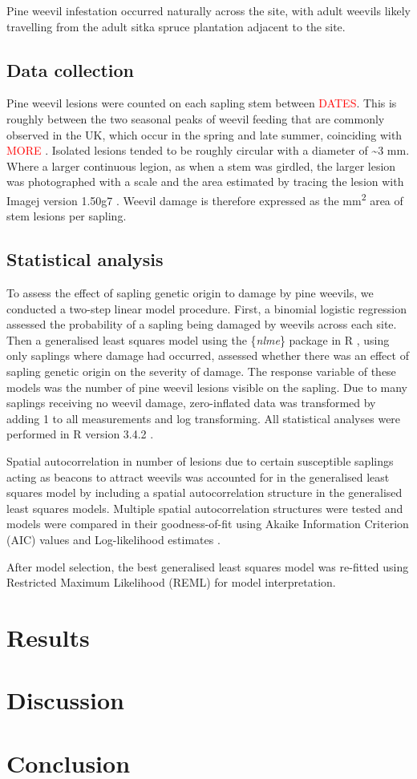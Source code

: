 \documentclass[a4paper, 11pt]{article}
\newcommand{\todo}[1]{\textcolor{red}{#1}}   %
\begin{document}
Pine weevil infestation occurred naturally across the site, with adult weevils likely travelling from the adult sitka spruce plantation adjacent to the site. 


\subsection*{Data collection}

Pine weevil lesions were counted on each sapling stem between \todo{DATES}. This is roughly between the two seasonal peaks of weevil feeding that are commonly observed in the UK, which occur in the spring and late summer, coinciding with \todo{MORE} \citep{}. Isolated lesions tended to be roughly circular with a diameter of \textasciitilde{}3 mm. Where a larger continuous legion, as when a stem was girdled, the larger lesion was photographed with a scale and the area estimated by tracing the lesion with Imagej version 1.50g7 \citep{Schneider2012}. Weevil damage is therefore expressed as the mm\textsuperscript{2} area of stem lesions per sapling. 

\subsection*{Statistical analysis}

To assess the effect of sapling genetic origin to damage by pine weevils, we conducted a two-step linear model procedure. First, a binomial logistic regression assessed the probability of a sapling being damaged by weevils across each site. Then a generalised least squares model using the \{\textit{nlme}\} package in R \citep{Pinheiro2018}, using only saplings where damage had occurred, assessed whether there was an effect of sapling genetic origin on the severity of damage. The response variable of these models was the number of pine weevil lesions visible on the sapling. Due to many saplings receiving no weevil damage, zero-inflated data was transformed by adding 1 to all measurements and log transforming. All statistical analyses were performed in R version 3.4.2 \citep{RCoreTeam2017}.

Spatial autocorrelation in number of lesions due to certain susceptible saplings acting as beacons to attract weevils was accounted for in the generalised least squares model by including a spatial autocorrelation structure in the generalised least squares models. Multiple spatial autocorrelation structures were tested and models were compared in their goodness-of-fit using Akaike Information Criterion (AIC) values and Log-likelihood estimates \citep{}. 

After model selection, the best generalised least squares model was re-fitted using Restricted Maximum Likelihood (REML) for model interpretation.

\section*{Results}

\section*{Discussion}

\section*{Conclusion}


\end{document}
